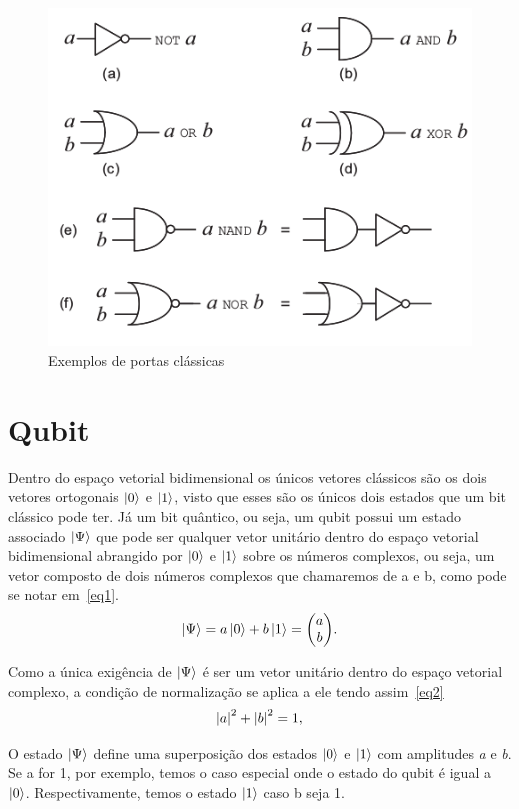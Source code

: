 \documentclass[a4paper, 12pt, oneside]{book}
\begin{document}
\begin{figure}[H]
\centering
\includegraphics[scale=0.5]{classiccircuit.png}
\caption{Exemplos de portas clássicas}
\label{fig:classiccircuit}
\end{figure}

\section{Qubit}
Dentro do espaço vetorial bidimensional os únicos vetores clássicos são os dois vetores ortogonais $\ket{0}$ e $\ket{1}$, visto que esses são os únicos dois estados que um bit clássico pode ter. Já um bit quântico, ou seja, um qubit possui um estado associado $\ket{\Psi}$ que pode ser qualquer vetor unitário dentro do espaço vetorial bidimensional abrangido por $\ket{0}$ e $\ket{1}$ sobre os números complexos, ou seja, um vetor composto de dois números complexos que chamaremos de a e b, como pode se notar em~\eqref{eq1}.
\begin{equation} \label{eq1} 
\ket{\Psi} = a\ket{0} + b\ket{1} = \mqty(a\\b).
\end{equation}

Como a única exigência de $\ket{\Psi}$ é ser um vetor unitário dentro do espaço vetorial complexo, a condição de normalização se aplica a ele tendo assim~\eqref{eq2}
\begin{equation}\label{eq2}
\abs{a}^2 + \abs{b}^2 = 1,
\end{equation}

O estado $\ket{\Psi}$ define uma superposição dos estados $\ket{0}$ e $\ket{1}$ com amplitudes \textit{a} e \textit{b}. Se a for 1, por exemplo, temos o caso especial onde o estado do qubit é igual a $\ket{0}$. Respectivamente, temos o estado $\ket{1}$ caso b seja 1.
\end{document}
